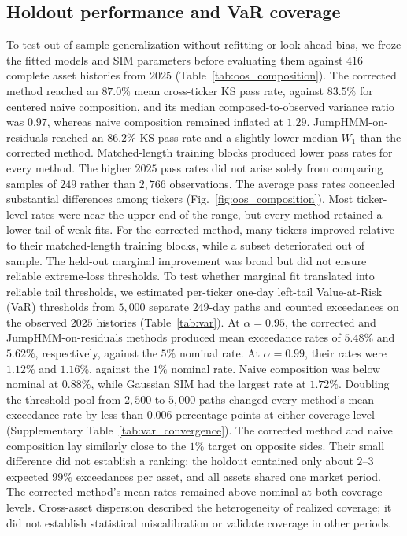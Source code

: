 \subsection{Holdout performance and VaR coverage}

To test out-of-sample generalization without refitting or look-ahead
bias, we froze the fitted models and SIM parameters before evaluating
them against $416$ complete asset histories from $2025$
(Table~\ref{tab:oos_composition}). The corrected
method reached an $87.0\%$ mean cross-ticker KS pass rate, against
$83.5\%$ for centered naive composition, and its median composed-to-observed
variance ratio was $0.97$, whereas naive composition remained
inflated at $1.29$. JumpHMM-on-residuals reached an $86.2\%$ KS pass
rate and a slightly lower median $W_1$ than the corrected method. Matched-length
training blocks produced lower pass rates for every method. The higher
$2025$ pass rates did not arise solely from comparing samples of
$249$ rather than $2{,}766$ observations.
The average pass rates concealed substantial differences among
tickers (Fig.~\ref{fig:oos_composition}). Most ticker-level rates
were near the upper end of the range, but every method retained a
lower tail of weak fits. For the corrected method, many tickers improved
relative to their matched-length training blocks, while a subset
deteriorated out of sample.
The held-out marginal improvement was broad but did not ensure
reliable extreme-loss thresholds.
To test whether marginal fit translated into reliable tail thresholds,
we estimated per-ticker one-day left-tail Value-at-Risk (VaR)
thresholds from $5{,}000$ separate $249$-day paths and counted
exceedances on the observed $2025$ histories (Table~\ref{tab:var}).
At $\alpha=0.95$, the corrected and JumpHMM-on-residuals methods
produced mean exceedance rates of $5.48\%$ and $5.62\%$, respectively,
against the $5\%$ nominal rate. At $\alpha=0.99$, their rates were
$1.12\%$ and $1.16\%$, against the $1\%$ nominal rate. Naive
composition was below nominal at $0.88\%$, while Gaussian SIM had
the largest rate at $1.72\%$. Doubling the threshold pool from
$2{,}500$ to $5{,}000$ paths changed every method's mean exceedance
rate by less than $0.006$ percentage points at either coverage level
(Supplementary Table~\ref{tab:var_convergence}). The corrected method and
naive composition lay similarly close to the $1\%$ target on
opposite sides. Their small difference did not establish a ranking:
the holdout contained only about $2$--$3$ expected $99\%$ exceedances
per asset, and all assets shared one market period. The corrected
method's mean rates remained above nominal at both coverage levels. Cross-asset dispersion described the
heterogeneity of realized coverage; it did not establish statistical
miscalibration or validate coverage in other periods.

